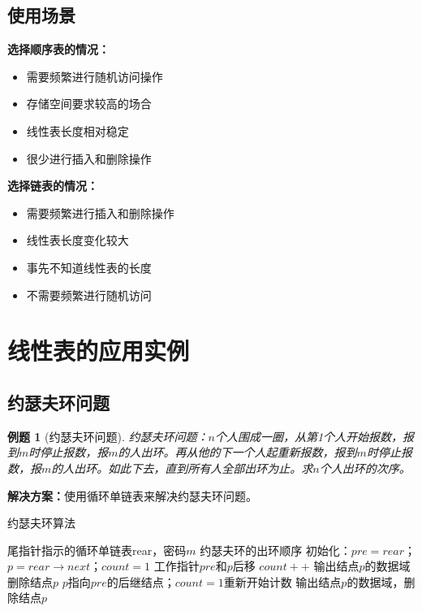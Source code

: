 \documentclass[12pt,a4paper]{amsart}
\newtheorem{example}{例题}[section]
\begin{document}
\subsection{使用场景}

\textbf{选择顺序表的情况：}
\begin{itemize}
\item 需要频繁进行随机访问操作
\item 存储空间要求较高的场合
\item 线性表长度相对稳定
\item 很少进行插入和删除操作
\end{itemize}

\textbf{选择链表的情况：}
\begin{itemize}
\item 需要频繁进行插入和删除操作
\item 线性表长度变化较大
\item 事先不知道线性表的长度
\item 不需要频繁进行随机访问
\end{itemize}

\section{线性表的应用实例}

\subsection{约瑟夫环问题}

\begin{example}[约瑟夫环问题]
约瑟夫环问题：$n$个人围成一圈，从第1个人开始报数，报到$m$时停止报数，报$m$的人出环。再从他的下一个人起重新报数，报到$m$时停止报数，报$m$的人出环。如此下去，直到所有人全部出环为止。求$n$个人出环的次序。
\end{example}

\textbf{解决方案：}使用循环单链表来解决约瑟夫环问题。

\begin{algorithm}[H]
\caption{约瑟夫环算法}
\begin{algorithmic}[1]
\REQUIRE 尾指针指示的循环单链表rear，密码$m$
\ENSURE 约瑟夫环的出环顺序
\STATE 初始化：$pre = rear$；$p = rear \rightarrow next$；$count = 1$
        \STATE 工作指针$pre$和$p$后移
        \STATE $count++$
    \ELSE
        \STATE 输出结点$p$的数据域
        \STATE 删除结点$p$
        \STATE $p$指向$pre$的后继结点；$count = 1$重新开始计数
    \ENDIF
\ENDWHILE
\STATE 输出结点$p$的数据域，删除结点$p$
\end{algorithmic}
\end{algorithm}
\end{document}
